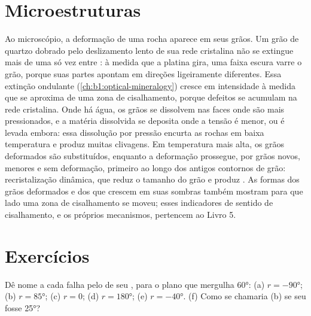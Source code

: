 \begin{omfigure}
\label{fig:b1:faults-folds-fabrics:vergence}
\end{omfigure}

\section{Microestruturas}\label{sec:b1:faults-folds-fabrics:micro}

Ao microscópio, a deformação de uma rocha aparece em seus grãos. Um grão de quartzo dobrado pelo deslizamento lento de sua rede cristalina não se extingue mais de uma só vez entre : à medida que a platina gira, uma faixa escura varre o grão, porque suas partes apontam em direções ligeiramente diferentes. Essa extinção ondulante (\cref{ch:b1:optical-mineralogy}) cresce em intensidade à medida que se aproxima de uma zona de cisalhamento, porque defeitos se acumulam na rede cristalina.
Onde há água, os grãos se dissolvem nas faces onde são mais pressionados, e a matéria dissolvida se deposita onde a tensão é menor, ou é levada embora: essa dissolução por pressão encurta as rochas em baixa temperatura e produz muitas clivagens. Em temperatura mais alta, os grãos deformados são substituídos, enquanto a deformação prossegue, por grãos novos, menores e sem deformação, primeiro ao longo dos antigos contornos de grão: recristalização dinâmica, que reduz o tamanho do grão e produz . As formas dos grãos deformados e dos  que crescem em suas sombras também mostram para que lado uma zona de cisalhamento se moveu; esses indicadores de sentido de cisalhamento, e os próprios mecanismos, pertencem ao Livro 5.

\section{Exercícios}

\begin{exercise}[$\star$]\label{exo:b1:faults-folds-fabrics:1}
Dê nome a cada falha pelo  de seu , para o plano que mergulha \ang{60}: (a) $r = \ang{-90}$; (b) $r = \ang{85}$; (c) $r = 0$; (d) $r = \ang{180}$; (e) $r = \ang{-40}$. (f) Como se chamaria (b) se seu  fosse \ang{25}?
\end{exercise}

